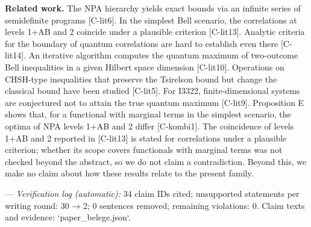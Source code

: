 \documentclass[10pt,twocolumn]{article}
\begin{document}
\textbf{Related work.} The NPA hierarchy yields exact bounds via an infinite series of semidefinite programs {\scriptsize[C-lit6]}. In the simplest Bell scenario, the correlations at levels 1+AB and 2 coincide under a plausible criterion {\scriptsize[C-lit13]}. Analytic criteria for the boundary of quantum correlations are hard to establish even there {\scriptsize[C-lit14]}. An iterative algorithm computes the quantum maximum of two-outcome Bell inequalities in a given Hilbert space dimension {\scriptsize[C-lit10]}. Operations on CHSH-type inequalities that preserve the Tsirelson bound but change the classical bound have been studied {\scriptsize[C-lit5]}. For I3322, finite-dimensional systems are conjectured not to attain the true quantum maximum {\scriptsize[C-lit9]}. Proposition E shows that, for a functional with marginal terms in the simplest scenario, the optima of NPA levels 1+AB and 2 differ {\scriptsize[C-kombi1]}. The coincidence of levels 1+AB and 2 reported in {\scriptsize[C-lit13]} is stated for correlations under a plausible criterion; whether its scope covers functionals with marginal terms was not checked beyond the abstract, so we do not claim a contradiction. Beyond this, we make no claim about how these results relate to the present family.

---
\emph{Verification log (automatic):} 34 claim IDs cited; unsupported statements per writing round: 30 → 2; 0 sentences removed; remaining violations: 0. Claim texts and evidence: `paper_belege.json`.
\end{document}
